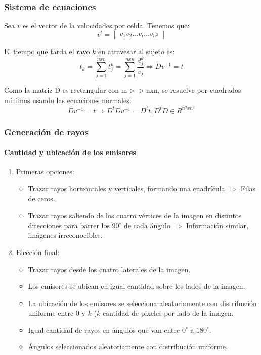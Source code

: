 \documentclass[11pt]{beamer}
\begin{document}
\begin{frame}
\frametitle{Sistema de ecuaciones}
\par Sea $v$ es el vector de la velocidades por celda. Tenemos que:
$$
v^t=\left[
\begin{array}{c}
v_1 
v_2 
... 
v_i 
... 
v_{n^2} 
\end{array}
\right]
$$
\par El tiempo que tarda el rayo $k$ en atravesar al sujeto es:
$$t_{k}=\sum_{j=1}^{nxn}t^k_{j} = \sum_{j=1}^{nxn} \dfrac{d^k_j}{v_{j}} \Rightarrow Dv^{-1}=t
$$
\par Como la matriz D es rectangular con m$>>$nxn, se resuelve por cuadrados mínimos usando las ecuaciones normales:
$$
Dv^{-1}=t \Rightarrow D^tDv^{-1}=D^tt, D^tD \in R^{n^2 x n^2}
$$
\end{frame}


\begin{frame}
\frametitle{Generación de rayos}
\framesubtitle{Cantidad y ubicación de los emisores}

\begin{enumerate}
    \item Primeras opciones:
    \begin{itemize}
        \item Trazar rayos horizontales y verticales, formando una cuadrícula $\Rightarrow$ Filas de ceros.
        \item Trazar rayos saliendo de los cuatro vértices de la imagen en distintos direcciones para barrer los $90^{\circ}$ de cada ángulo $\Rightarrow$ Información similar, imágenes irreconocibles.
    \end{itemize}
    \item Elección final:
    \begin{itemize}
        
    \item Trazar rayos desde los cuatro laterales de la imagen.
    \item Los emisores se ubican en igual cantidad sobre los lados de la imagen.
    \item La ubicación de los emisores se selecciona aleatoriamente con distribución uniforme entre $0$ y $k$ ($k$ cantidad de pixeles por lado de la imagen.
    \item Igual cantidad de rayos en ángulos que van entre $0^{\circ}$ a $180^{\circ}$.
    \item Ángulos seleccionados aleatoriamente con distribución uniforme.
    \end{itemize}

\end{enumerate}

\end{frame}
\end{document}
